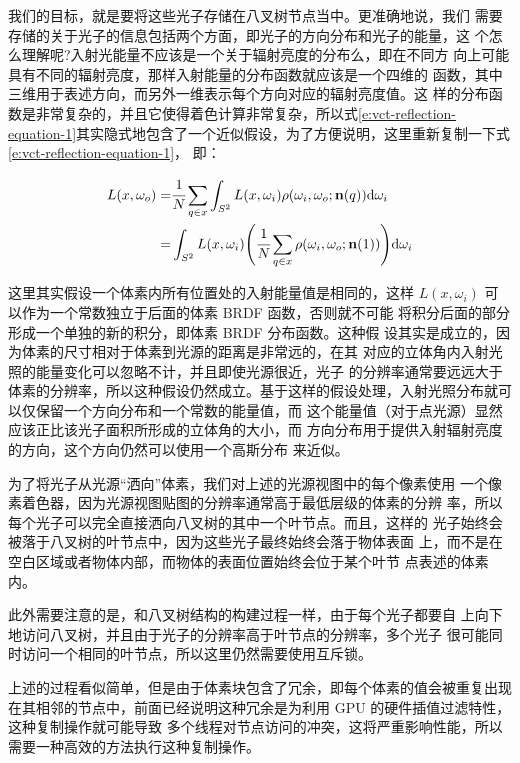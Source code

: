 我们的目标，就是要将这些光子存储在八叉树节点当中。更准确地说，我们 需要存储的关于光子的信息包括两个方面，即光子的方向分布和光子的能量，这 个怎么理解呢?入射光能量不应该是一个关于辐射亮度的分布么，即在不同方 向上可能具有不同的辐射亮度，那样入射能量的分布函数就应该是一个四维的 函数，其中三维用于表述方向，而另外一维表示每个方向对应的辐射亮度值。这 样的分布函数是非常复杂的，并且它使得着色计算非常复杂，所以式\ref{e:vct-reflection-equation-1}其实隐式地包含了一个近似假设，为了方便说明，这里重新复制一下式\ref{e:vct-reflection-equation-1}， 即：

\begin{equation}
\begin{aligned}
	L({x},\omega_o)=&\cfrac{1}{N}\sum_{q\in {x}}\int_{S^{2}}L({x},\omega_i)\rho(\omega_i,\omega_o;\mathbf{n}(q)){\rm d}\omega_i\\
	=&\int_{S^{2}}L({x},\omega_i)\Biggl(\cfrac{1}{N}\sum_{q\in {x}}\rho(\omega_i,\omega_o;\mathbf{n}(1))\Biggl){\rm d}\omega_i
\end{aligned}
\end{equation}

这里其实假设一个体素内所有位置处的入射能量值是相同的，这样 $L({x}, \omega_i)$ 可以作为一个常数独立于后面的体素 BRDF 函数，否则就不可能 将积分后面的部分形成一个单独的新的积分，即体素 BRDF 分布函数。这种假 设其实是成立的，因为体素的尺寸相对于体素到光源的距离是非常远的，在其 对应的立体角内入射光照的能量变化可以忽略不计，并且即使光源很近，光子 的分辨率通常要远远大于体素的分辨率，所以这种假设仍然成立。基于这样的假设处理，入射光照分布就可以仅保留一个方向分布和一个常数的能量值，而 这个能量值（对于点光源）显然应该正比该光子面积所形成的立体角的大小，而 方向分布用于提供入射辐射亮度的方向，这个方向仍然可以使用一个高斯分布 来近似。

为了将光子从光源“洒向”体素，我们对上述的光源视图中的每个像素使用 一个像素着色器，因为光源视图贴图的分辨率通常高于最低层级的体素的分辨 率，所以每个光子可以完全直接洒向八叉树的其中一个叶节点。而且，这样的 光子始终会被落于八叉树的叶节点中，因为这些光子最终始终会落于物体表面 上，而不是在空白区域或者物体内部，而物体的表面位置始终会位于某个叶节 点表述的体素内。

此外需要注意的是，和八叉树结构的构建过程一样，由于每个光子都要自 上向下地访问八叉树，并且由于光子的分辨率高于叶节点的分辨率，多个光子 很可能同时访问一个相同的叶节点，所以这里仍然需要使用互斥锁。

上述的过程看似简单，但是由于体素块包含了冗余，即每个体素的值会被重复出现在其相邻的节点中，前面已经说明这种冗余是为利用 GPU 的硬件插值过滤特性，这种复制操作就可能导致 多个线程对节点访问的冲突，这将严重影响性能，所以需要一种高效的方法执行这种复制操作。





